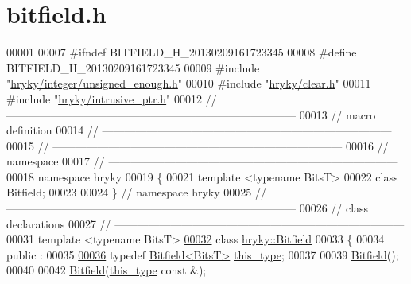 \hypertarget{bitfield_8h_source}{\section{bitfield.\-h}
}

\begin{DoxyCode}
00001 
00007 \textcolor{preprocessor}{#ifndef BITFIELD\_H\_20130209161723345}
00008 \textcolor{preprocessor}{}\textcolor{preprocessor}{#define BITFIELD\_H\_20130209161723345}
00009 \textcolor{preprocessor}{}\textcolor{preprocessor}{#include "\hyperlink{unsigned__enough_8h}{hryky/integer/unsigned_enough.h}"}
00010 \textcolor{preprocessor}{#include "\hyperlink{clear_8h}{hryky/clear.h}"}
00011 \textcolor{preprocessor}{#include "\hyperlink{intrusive__ptr_8h}{hryky/intrusive_ptr.h}"}
00012 \textcolor{comment}{//
      ------------------------------------------------------------------------------}
00013 \textcolor{comment}{// macro definition}
00014 \textcolor{comment}{//
      ------------------------------------------------------------------------------}
00015 \textcolor{comment}{//
      ------------------------------------------------------------------------------}
00016 \textcolor{comment}{// namespace}
00017 \textcolor{comment}{//
      ------------------------------------------------------------------------------}
00018 \textcolor{keyword}{namespace }hryky
00019 \{
00021     \textcolor{keyword}{template} <\textcolor{keyword}{typename} BitsT>
00022     \textcolor{keyword}{class }Bitfield;
00023 
00024 \} \textcolor{comment}{// namespace hryky}
00025 \textcolor{comment}{//
      ------------------------------------------------------------------------------}
00026 \textcolor{comment}{// class declarations}
00027 \textcolor{comment}{//
      ------------------------------------------------------------------------------}
00031 \textcolor{comment}{}\textcolor{keyword}{template} <\textcolor{keyword}{typename} BitsT>
\hypertarget{bitfield_8h_source_l00032}{}\hyperlink{classhryky_1_1_bitfield}{00032} \textcolor{keyword}{class }\hyperlink{classhryky_1_1_bitfield}{hryky::Bitfield}
00033 \{
00034 \textcolor{keyword}{public} :
00035 
\hypertarget{bitfield_8h_source_l00036}{}\hyperlink{classhryky_1_1_bitfield_a92159139a91a26878ed5293d99024434}{00036}     \textcolor{keyword}{typedef} \hyperlink{classhryky_1_1_bitfield}{Bitfield<BitsT>} \hyperlink{classhryky_1_1_bitfield_a92159139a91a26878ed5293d99024434}{this_type};
00037 
00039     \hyperlink{classhryky_1_1_bitfield_abfb50271df7f7488c79371587846da92}{Bitfield}();
00040 
00042     \hyperlink{classhryky_1_1_bitfield_abfb50271df7f7488c79371587846da92}{Bitfield}(\hyperlink{classhryky_1_1_bitfield}{this_type} \textcolor{keyword}{const} &);

\end{DoxyCode}
